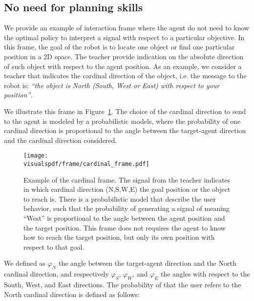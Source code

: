 \subsection{No need for planning skills}

We provide an example of interaction frame where the agent do not need to know the optimal policy to interpret a signal with respect to a particular objective. In this frame, the goal of the robot is to locate one object or find one particular position in a 2D space. The teacher provide indication on the absolute direction of such object with respect to the agent position. As an example, we consider a teacher that indicates the cardinal direction of the object, i.e. the message to the robot is: \emph{``the object is North (South, West or East) with respect to your position''}.

We illustrate this frame in Figure~\ref{fig:cardinalframe}. The choice of the cardinal direction to send to the agent is modeled by a probabilistic models, where the probability of one cardinal direction is proportional to the angle between the target-agent direction and the cardinal direction considered.

\begin{figure}[!htbp]
    \centering
    \texttt{[image: \\visualspdf/frame/cardinal\_frame.pdf]}
    \caption{Example of the cardinal frame. The signal from the teacher indicates in which cardinal direction (N,S,W,E) the goal position or the object to reach is. There is a probabilistic model that describe the user behavior, such that the probability of generating a signal of meaning ``West'' is proportional to the angle between the agent position and the target position. This frame does not requires the agent to know how to reach the target position, but only its own position with respect to that goal.}
    \label{fig:cardinalframe}
\end{figure}

We defined as $\varphi_N$ the angle between the target-agent direction and the North cardinal direction, and respectively $\varphi_S$, $\varphi_W$, and $\varphi_E$ the angles with respect to the South, West, and East directions. The probability of that the user refers to the North cardinal direction is defined as follows:

